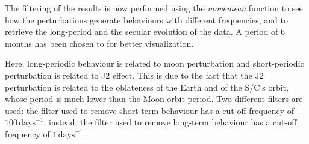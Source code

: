 The filtering of the results is now performed using the \textit{movemean} function to see how the perturbations generate behaviours with different frequencies, and to retrieve the long-period and the secular evolution of the data. A period of 6 months has been chosen to for better visualization. 


Here, long-periodic behaviour is related to moon perturbation and short-periodic perturbation is related to J2 effect. This is due to the fact that the J2 perturbation is related to the oblateness of the Earth and of the S/C’s orbit, whose period is much lower than the Moon orbit period. Two different filters are used: the filter used to remove short-term behaviour has a cut-off frequency of \(100 \, \text{days}^{-1}\), instead, the filter used to remove long-term behaviour has a cut-off frequency of \(1 \, \text{days}^{-1}\).